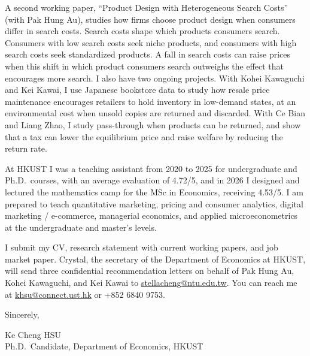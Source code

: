 \documentclass[11pt]{article}
\begin{document}
A second working paper, ``Product Design with Heterogeneous Search Costs'' (with Pak Hung Au), studies how firms choose product design when consumers differ in search costs. Search costs shape which products consumers search. Consumers with low search costs seek niche products, and consumers with high search costs seek standardized products. A fall in search costs can raise prices when this shift in which product consumers search outweighs the effect that encourages more search. I also have two ongoing projects. With Kohei Kawaguchi and Kei Kawai, I use Japanese bookstore data to study how resale price maintenance encourages retailers to hold inventory in low-demand states, at an environmental cost when unsold copies are returned and discarded. With Ce Bian and Liang Zhao, I study pass-through when products can be returned, and show that a tax can lower the equilibrium price and raise welfare by reducing the return rate.

At HKUST I was a teaching assistant from 2020 to 2025 for undergraduate and Ph.D.\ courses, with an average evaluation of 4.72/5, and in 2026 I designed and lectured the mathematics camp for the MSc in Economics, receiving 4.53/5. I am prepared to teach quantitative marketing, pricing and consumer analytics, digital marketing / e-commerce, managerial economics, and applied microeconometrics at the undergraduate and master's levels.

I submit my CV, research statement with current working papers, and job market paper. Crystal, the secretary of the Department of Economics at HKUST, will send three confidential recommendation letters on behalf of Pak Hung Au, Kohei Kawaguchi, and Kei Kawai to \href{mailto:stellacheng@ntu.edu.tw}{stellacheng@ntu.edu.tw}. You can reach me at \href{mailto:khsu@connect.ust.hk}{khsu@connect.ust.hk} or +852 6840 9753.

\vspace{0.25em}
Sincerely,

\vspace{0.25em}
Ke Cheng HSU \\
Ph.D.\ Candidate, Department of Economics, HKUST
\end{document}
